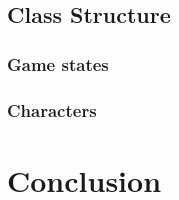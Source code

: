 \documentclass{article}
\begin{document}
\subsection{Class Structure}

\subsubsection{Game states}

\subsubsection{Characters}

\section{Conclusion}


\printbibliography
\end{document}
